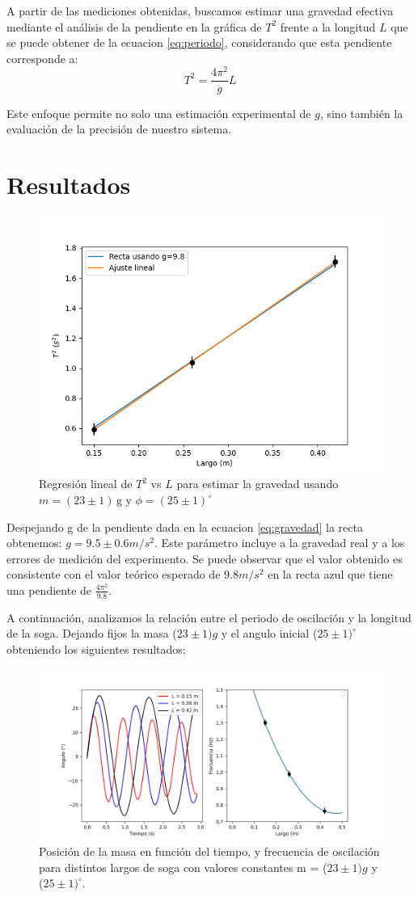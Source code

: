 \documentclass[12pt,a4]{article}
\begin{document}
A partir de las mediciones obtenidas, buscamos estimar una gravedad efectiva mediante el análisis de la pendiente en la gráfica de \( T^2 \) frente a la longitud \( L \) que se puede obtener de la ecuacion \ref{eq:periodo}, considerando que esta pendiente corresponde a:
\begin{equation}
    T^2 = \frac{4 \pi^2}{g} L
    \label{eq:gravedad}
\end{equation}

Este enfoque permite no solo una estimación experimental de \( g \), sino también la evaluación de la precisión de nuestro sistema. 

\section{Resultados}

\begin{figure}[H]
    \centering
    \includegraphics[width=0.6\linewidth]{gravedad.png}
    \caption{Regresión lineal de \( T^2 \) vs \( L \) para estimar la gravedad usando $m = (23 \pm 1) \, \text{g}$ y $\phi = (25 \pm 1)^\circ$}
    \label{fig:gravedad}
\end{figure}

Despejando g de la pendiente dada en la ecuacion \ref{eq:gravedad} la recta obtenemos: $g = 9.5 \pm 0.6 m/s^2$. Este parámetro incluye a la gravedad real y a los errores de medición del experimento. Se puede observar que el valor obtenido es consistente con el valor teórico esperado de $9.8 m/s^2$ en la recta azul que tiene una pendiente de $\frac{4\pi^2}{9.8}$.

A continuación, analizamos la relación entre el periodo de oscilación y la longitud de la soga. Dejando fijos la masa ($23 \pm 1) g$ y el angulo inicial ($25 \pm 1) ^\circ$ obteniendo los siguientes resultados:

\begin{figure}[H]
    \centering
    \includegraphics[width=0.6\linewidth]{largo.png}
    \caption{Posición de la masa en función del tiempo, y frecuencia de oscilación para distintos largos de soga con valores constantes m = ($23 \pm 1) g$ y ($25 \pm 1) ^\circ$.}
    \label{fig:largo}
\end{figure}
\end{document}
